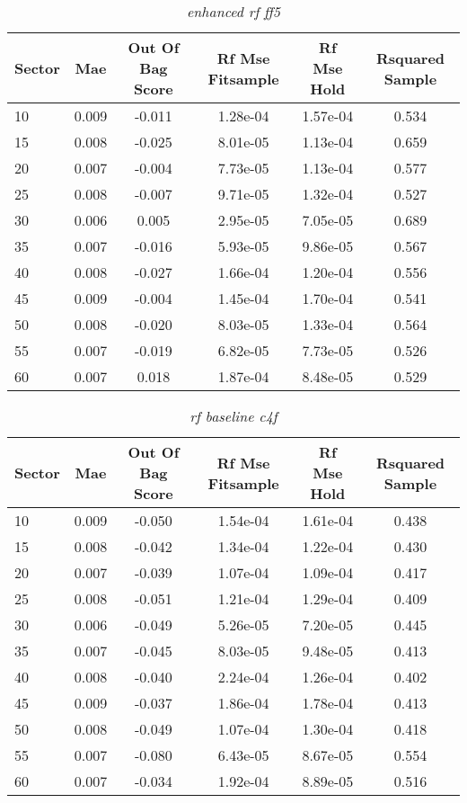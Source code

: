 \begin{table}[H]
\caption{\textit{enhanced rf ff5}}\label{tab:enhanced_rf_ff5}
\centering
\begin{tabular}{lccccc}
\hline\hline
Sector & Mae & Out Of Bag Score & Rf Mse Fitsample & Rf Mse Hold & Rsquared Sample \\ 
\hline
10 & 0.009 & -0.011 & 1.28e-04 & 1.57e-04 & 0.534 \\ 
15 & 0.008 & -0.025 & 8.01e-05 & 1.13e-04 & 0.659 \\ 
20 & 0.007 & -0.004 & 7.73e-05 & 1.13e-04 & 0.577 \\ 
25 & 0.008 & -0.007 & 9.71e-05 & 1.32e-04 & 0.527 \\ 
30 & 0.006 & 0.005 & 2.95e-05 & 7.05e-05 & 0.689 \\ 
35 & 0.007 & -0.016 & 5.93e-05 & 9.86e-05 & 0.567 \\ 
40 & 0.008 & -0.027 & 1.66e-04 & 1.20e-04 & 0.556 \\ 
45 & 0.009 & -0.004 & 1.45e-04 & 1.70e-04 & 0.541 \\ 
50 & 0.008 & -0.020 & 8.03e-05 & 1.33e-04 & 0.564 \\ 
55 & 0.007 & -0.019 & 6.82e-05 & 7.73e-05 & 0.526 \\ 
60 & 0.007 & 0.018 & 1.87e-04 & 8.48e-05 & 0.529 \\ 
\hline
\end{tabular}
\end{table}


\begin{table}[H]
\caption{\textit{rf baseline c4f}}\label{tab:rf_baseline_c4f}
\centering
\begin{tabular}{lccccc}
\hline\hline
Sector & Mae & Out Of Bag Score & Rf Mse Fitsample & Rf Mse Hold & Rsquared Sample \\ 
\hline
10 & 0.009 & -0.050 & 1.54e-04 & 1.61e-04 & 0.438 \\ 
15 & 0.008 & -0.042 & 1.34e-04 & 1.22e-04 & 0.430 \\ 
20 & 0.007 & -0.039 & 1.07e-04 & 1.09e-04 & 0.417 \\ 
25 & 0.008 & -0.051 & 1.21e-04 & 1.29e-04 & 0.409 \\ 
30 & 0.006 & -0.049 & 5.26e-05 & 7.20e-05 & 0.445 \\ 
35 & 0.007 & -0.045 & 8.03e-05 & 9.48e-05 & 0.413 \\ 
40 & 0.008 & -0.040 & 2.24e-04 & 1.26e-04 & 0.402 \\ 
45 & 0.009 & -0.037 & 1.86e-04 & 1.78e-04 & 0.413 \\ 
50 & 0.008 & -0.049 & 1.07e-04 & 1.30e-04 & 0.418 \\ 
55 & 0.007 & -0.080 & 6.43e-05 & 8.67e-05 & 0.554 \\ 
60 & 0.007 & -0.034 & 1.92e-04 & 8.89e-05 & 0.516 \\ 
\hline
\end{tabular}
\end{table}


